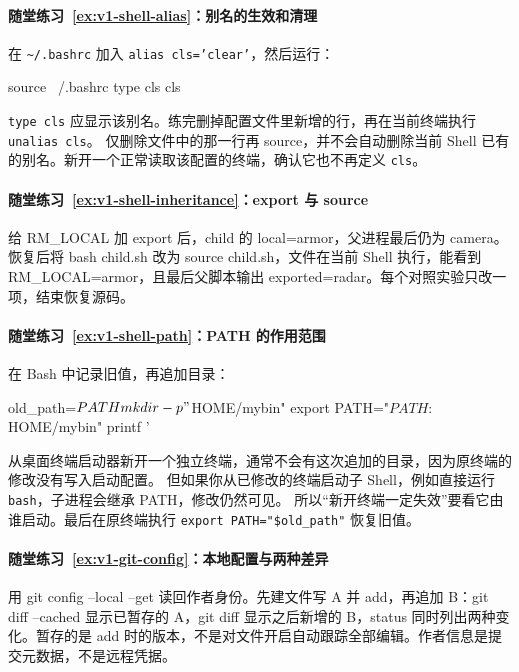 \paragraph*{随堂练习~\ref{ex:v1-shell-alias}：别名的生效和清理}
\begin{solution}
在 \texttt{\textasciitilde/.bashrc} 加入 \texttt{alias cls='clear'}，然后运行：

\begin{tbash}
source ~/.bashrc
type cls
cls
\end{tbash}

\texttt{type cls} 应显示该别名。练完删掉配置文件里新增的行，再在当前终端执行 \texttt{unalias cls}。
仅删除文件中的那一行再 source，并不会自动删除当前 Shell 已有的别名。新开一个正常读取该配置的终端，确认它也不再定义 \texttt{cls}。
\end{solution}

\paragraph*{随堂练习~\ref{ex:v1-shell-inheritance}：export 与 source}
\begin{solution}
给 RM\_LOCAL 加 export 后，child 的 local=armor，父进程最后仍为 camera。恢复后将 bash child.sh 改为 source child.sh，文件在当前 Shell 执行，能看到 RM\_LOCAL=armor，且最后父脚本输出 exported=radar。每个对照实验只改一项，结束恢复源码。
\end{solution}
\paragraph*{随堂练习~\ref{ex:v1-shell-path}：PATH 的作用范围}
\begin{solution}
在 Bash 中记录旧值，再追加目录：

\begin{tbash}
old_path=$PATH
mkdir -p "$HOME/mybin"
export PATH="$PATH:$HOME/mybin"
printf '%
\end{tbash}

从桌面终端启动器新开一个独立终端，通常不会有这次追加的目录，因为原终端的修改没有写入启动配置。
但如果你从已修改的终端启动子 Shell，例如直接运行 \texttt{bash}，子进程会继承 PATH，修改仍然可见。
所以“新开终端一定失效”要看它由谁启动。最后在原终端执行 \texttt{export PATH="\$old\_path"} 恢复旧值。
\end{solution}


\paragraph*{随堂练习~\ref{ex:v1-git-config}：本地配置与两种差异}
\begin{solution}
用 git config --local --get 读回作者身份。先建文件写 A 并 add，再追加 B：git diff --cached 显示已暂存的 A，git diff 显示之后新增的 B，status 同时列出两种变化。暂存的是 add 时的版本，不是对文件开启自动跟踪全部编辑。作者信息是提交元数据，不是远程凭据。
\end{solution}
